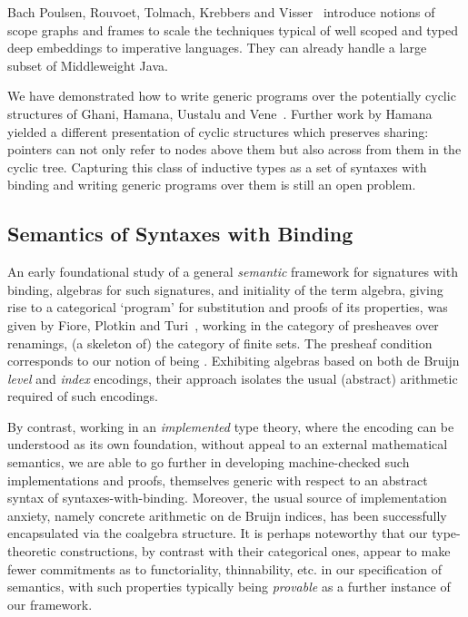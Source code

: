 {Bach Poulsen, Rouvoet, Tolmach, Krebbers and Visser~\citeyear{BachPoulsen}
introduce notions of scope graphs and frames to scale the techniques typical
of well scoped and typed deep embeddings to imperative languages. They can
already handle a large subset of Middleweight Java.

We have demonstrated how to write generic programs over the potentially
cyclic structures of Ghani, Hamana, Uustalu and Vene~\citeyear{ghani2006representing}.
Further work by Hamana~\citeyear{Hamana2009} yielded a different presentation
of cyclic structures which preserves sharing: pointers can not only refer
to nodes above them but also across from them in the cyclic tree. Capturing
this class of inductive types as a set of syntaxes with binding and writing
generic programs over them is still an open problem.

\subsection{Semantics of Syntaxes with Binding} An early foundational study
of a general \emph{semantic} framework for signatures with binding, algebras
for such signatures, and initiality of the term algebra, giving rise to a
categorical `program' for substitution and proofs of its properties, was given
by Fiore, Plotkin and Turi~\cite{FiorePlotkinTuri99}, working in the category of presheaves
over renamings, (a skeleton of) the category of finite sets. The presheaf
condition corresponds to our notion of being . Exhibiting
algebras based on both de Bruijn \emph{level} and \emph{index} encodings,
their approach isolates the usual (abstract) arithmetic required of such encodings.

By contrast, working in an \emph{implemented} type theory, where the encoding
can be understood as its own foundation, without appeal to an external mathematical
semantics, we are able to go further in developing machine-checked such
implementations and proofs, themselves generic with respect to an abstract syntax
 of syntaxes-with-binding. Moreover, the usual source of implementation
anxiety, namely concrete arithmetic on de Bruijn indices, has been successfully
encapsulated via the  coalgebra structure. It is perhaps noteworthy that
our type-theoretic constructions, by contrast with their categorical ones,
appear to make fewer commitments as to functoriality, thinnability, etc. in our
specification of semantics, with such properties typically being \emph{provable}
as a further instance of our framework.

}
